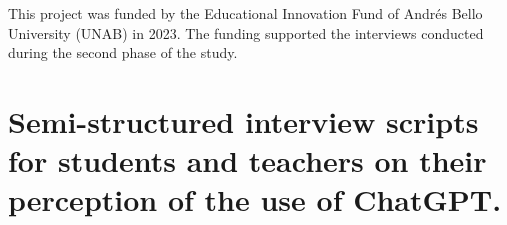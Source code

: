 \documentclass[english]{textolivre}
\begin{document}
\begin{dataavailability}
\end{dataavailability}

\begin{funding}
This project was funded by the Educational Innovation Fund of Andrés Bello University (UNAB) in 2023. The funding supported the interviews conducted during the second phase of the study. 
\end{funding}

\newpage
\appendix 

\section{Semi-structured interview scripts for students and teachers on their perception of the use of ChatGPT.}\label{apx-longtable1} 
\end{document}
